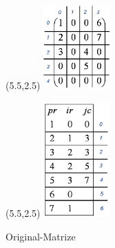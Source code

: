 

\begin{figure}[b]
\setlength{\unitlength}{1cm}
	\begin{minipage}[t]{5.5cm}
	\begin{picture}(5.5,2.5)
	\includegraphics[width=1in]{.//pic//orignal_sparse}
	\end{picture}\par
	\caption{Original-Matrize}
	\end{minipage}\hfill
	\begin{minipage}[t]{5.5cm}
	\begin{picture}(5.5,2.5)
	\includegraphics[width=1in]{.//pic//numerische_sparse2}
	\end{picture}\par
	\end{minipage}\hfill
\end{figure}
